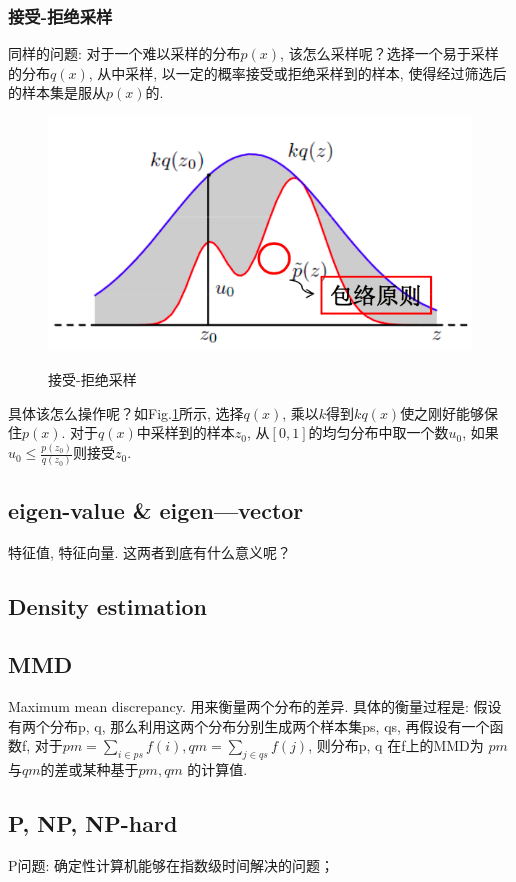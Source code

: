 \subsubsection{接受-拒绝采样}
同样的问题: 对于一个难以采样的分布$p(x)$, 该怎么采样呢？选择一个易于采样的分布$q(x)$, 从中采样, 以一定的概率接受或拒绝采样到的样本, 使得经过筛选后的样本集是服从$p(x)$的. 
\begin{figure}[h]
	\centering
	\includegraphics[width=.6\textwidth]{pics/accept-reject-sample.png}
	\label{fig:accept-reject-sample}
	\caption{接受-拒绝采样}
\end{figure}
具体该怎么操作呢？如Fig.\ref{fig:accept-reject-sample}所示, 选择$q(x)$, 乘以$k$得到$kq(x)$使之刚好能够保住$p(x)$. 对于$q(x)$中采样到的样本$z_0$, 从$[0, 1]$的均匀分布中取一个数$u_0$, 如果$u_0 \le \frac{p(z_0)}{q(z_0)}$则接受$z_0$. 

\subsection{eigen-value \& eigen—vector }
特征值, 特征向量. 
这两者到底有什么意义呢？


\subsection{Density estimation }

\subsection{MMD}
Maximum mean discrepancy.  用来衡量两个分布的差异. 具体的衡量过程是: 
假设有两个分布p, q, 那么利用这两个分布分别生成两个样本集ps, qs, 再假设有一个函数f, 对于$pm = \sum_{i \in ps}f(i), qm = \sum_{j \in qs}f(j) $,
则分布p, q 在f上的MMD为 $pm$与$qm$的差或某种基于$pm, qm$ 的计算值. 

\subsection{P, NP, NP-hard}
P问题: 确定性计算机能够在指数级时间解决的问题；

